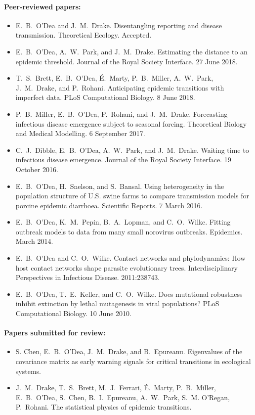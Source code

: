 \documentclass[a4paper]{article}
\begin{document}
\paragraph{Peer-reviewed papers:}
\begin{itemize}
  \item[~] E.\ B.\ O'Dea and J.\ M.\ Drake.  Disentangling reporting and disease transmission. Theoretical Ecology. Accepted.
  \item[~] E.\ B.\ O'Dea, A.\ W.\ Park, and J.\ M.\ Drake.  Estimating
    the distance to an epidemic threshold. Journal of the Royal
    Society Interface. 27 June 2018.
  \item[~] T.\ S.\ Brett, E.\ B.\ O'Dea, \'{E}.\ Marty,
    P.\ B.\ Miller, A.\ W.\ Park, J.\ M.\ Drake, and
    P.\ Rohani. Anticipating epidemic transitions with imperfect
    data. PLoS Computational Biology. 8 June 2018.
  \item[~] P.\ B.\ Miller, E.\ B.\ O'Dea, P.\ Rohani, and
    J.\ M.\ Drake. Forecasting infectious disease emergence subject to
    seasonal forcing. Theoretical Biology and Medical Modelling. 6
    September 2017.
  \item[~] C.\ J.\ Dibble, E.\ B.\ O'Dea, A.\ W.\ Park, and
    J.\ M.\ Drake. Waiting time to infectious disease
    emergence. Journal of the Royal Society Interface. 19 October 2016.
  \item[~] E.\ B.\ O'Dea, H.\ Snelson, and S.\ Bansal. Using
    heterogeneity in the population structure of U.S. swine farms to
    compare transmission models for porcine epidemic
    diarrhoea. Scientific Reports. 7 March 2016.
  \item[~] E.\ B.\ O'Dea, K.\ M.\ Pepin, B.\ A.\ Lopman, and
    C.\ O.\ Wilke. Fitting outbreak models to data from many small
    norovirus outbreaks. Epidemics. March 2014.
  \item[~] E.\ B.\ O'Dea and C.\ O.\ Wilke. Contact networks and
    phylodynamics: How host contact networks shape parasite
    evolutionary trees. Interdisciplinary Perspectives in Infectious
    Disease. 2011:238743.
  \item[~] E.\ B.\ O'Dea, T.\ E.\ Keller, and C.\ O.\ Wilke. Does
    mutational robustness inhibit extinction by lethal mutagenesis in
    viral populations? PLoS Computational Biology. 10 June 2010.
\end{itemize}

\paragraph{Papers submitted for review:}
\begin{itemize}
  \item[~] S. Chen, E.\ B.\ O'Dea, J.\ M.\ Drake, and
    B.\ Epureanu. Eigenvalues of the covariance matrix as early
    warning signals for critical transitions in ecological systems.
  \item[~] J.\ M.\ Drake, T.\ S.\ Brett, M.\ J.\ Ferrari,
    \'{E}.\ Marty, P.\ B.\ Miller, E.\ B.\ O'Dea, S.\ Chen,
    B.\ I.\ Epureanu, A.\ W.\ Park, S.\ M. O'Regan, P.\ Rohani. The
    statistical physics of epidemic transitions.
\end{itemize}
\end{document}

